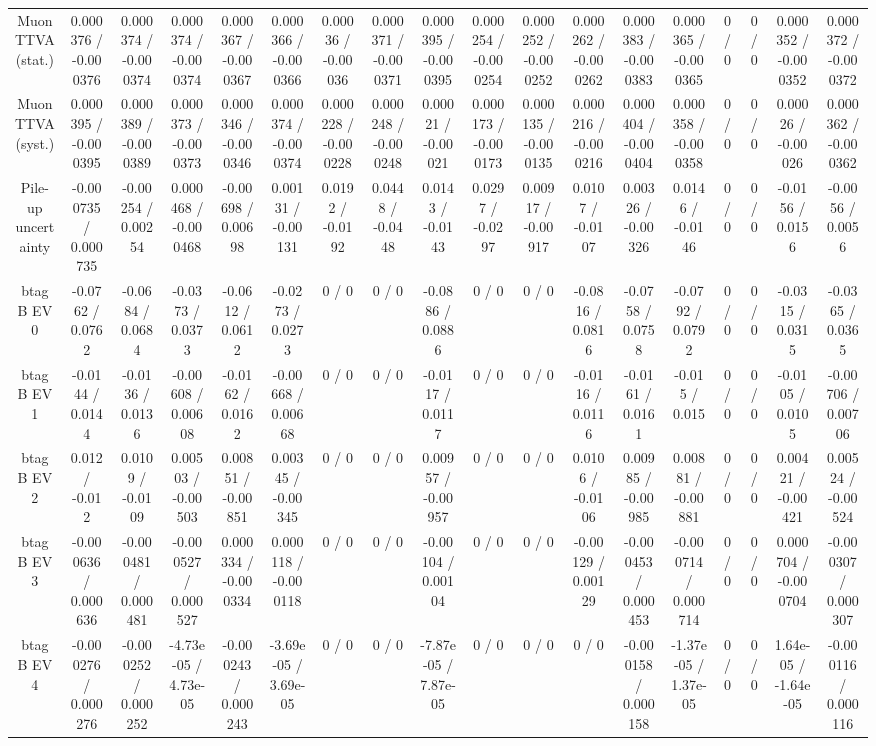 \documentclass[10pt]{article}
\begin{document}
\begin{table}[htbp]
\begin{center}
\begin{tabular}{|c|c|c|c|c|c|c|c|c|c|c|c|c|c|c|c|c|c|}
  Muon TTVA (stat.) & 0.000376 / -0.000376 & 0.000374 / -0.000374 & 0.000374 / -0.000374 & 0.000367 / -0.000367 & 0.000366 / -0.000366 & 0.00036 / -0.00036 & 0.000371 / -0.000371 & 0.000395 / -0.000395 & 0.000254 / -0.000254 & 0.000252 / -0.000252 & 0.000262 / -0.000262 & 0.000383 / -0.000383 & 0.000365 / -0.000365 & 0 / 0 & 0 / 0 & 0.000352 / -0.000352 & 0.000372 / -0.000372 \\ 
  Muon TTVA (syst.) & 0.000395 / -0.000395 & 0.000389 / -0.000389 & 0.000373 / -0.000373 & 0.000346 / -0.000346 & 0.000374 / -0.000374 & 0.000228 / -0.000228 & 0.000248 / -0.000248 & 0.00021 / -0.00021 & 0.000173 / -0.000173 & 0.000135 / -0.000135 & 0.000216 / -0.000216 & 0.000404 / -0.000404 & 0.000358 / -0.000358 & 0 / 0 & 0 / 0 & 0.00026 / -0.00026 & 0.000362 / -0.000362 \\ 
  Pile-up uncertainty & -0.000735 / 0.000735 & -0.00254 / 0.00254 & 0.000468 / -0.000468 & -0.00698 / 0.00698 & 0.00131 / -0.00131 & 0.0192 / -0.0192 & 0.0448 / -0.0448 & 0.0143 / -0.0143 & 0.0297 / -0.0297 & 0.00917 / -0.00917 & 0.0107 / -0.0107 & 0.00326 / -0.00326 & 0.0146 / -0.0146 & 0 / 0 & 0 / 0 & -0.0156 / 0.0156 & -0.0056 / 0.0056 \\ 
  btag B EV 0 & -0.0762 / 0.0762 & -0.0684 / 0.0684 & -0.0373 / 0.0373 & -0.0612 / 0.0612 & -0.0273 / 0.0273 & 0 / 0 & 0 / 0 & -0.0886 / 0.0886 & 0 / 0 & 0 / 0 & -0.0816 / 0.0816 & -0.0758 / 0.0758 & -0.0792 / 0.0792 & 0 / 0 & 0 / 0 & -0.0315 / 0.0315 & -0.0365 / 0.0365 \\ 
  btag B EV 1 & -0.0144 / 0.0144 & -0.0136 / 0.0136 & -0.00608 / 0.00608 & -0.0162 / 0.0162 & -0.00668 / 0.00668 & 0 / 0 & 0 / 0 & -0.0117 / 0.0117 & 0 / 0 & 0 / 0 & -0.0116 / 0.0116 & -0.0161 / 0.0161 & -0.015 / 0.015 & 0 / 0 & 0 / 0 & -0.0105 / 0.0105 & -0.00706 / 0.00706 \\ 
  btag B EV 2 & 0.012 / -0.012 & 0.0109 / -0.0109 & 0.00503 / -0.00503 & 0.00851 / -0.00851 & 0.00345 / -0.00345 & 0 / 0 & 0 / 0 & 0.00957 / -0.00957 & 0 / 0 & 0 / 0 & 0.0106 / -0.0106 & 0.00985 / -0.00985 & 0.00881 / -0.00881 & 0 / 0 & 0 / 0 & 0.00421 / -0.00421 & 0.00524 / -0.00524 \\ 
  btag B EV 3 & -0.000636 / 0.000636 & -0.000481 / 0.000481 & -0.000527 / 0.000527 & 0.000334 / -0.000334 & 0.000118 / -0.000118 & 0 / 0 & 0 / 0 & -0.00104 / 0.00104 & 0 / 0 & 0 / 0 & -0.00129 / 0.00129 & -0.000453 / 0.000453 & -0.000714 / 0.000714 & 0 / 0 & 0 / 0 & 0.000704 / -0.000704 & -0.000307 / 0.000307 \\ 
  btag B EV 4 & -0.000276 / 0.000276 & -0.000252 / 0.000252 & -4.73e-05 / 4.73e-05 & -0.000243 / 0.000243 & -3.69e-05 / 3.69e-05 & 0 / 0 & 0 / 0 & -7.87e-05 / 7.87e-05 & 0 / 0 & 0 / 0 & 0 / 0 & -0.000158 / 0.000158 & -1.37e-05 / 1.37e-05 & 0 / 0 & 0 / 0 & 1.64e-05 / -1.64e-05 & -0.000116 / 0.000116 \\ 

\end{tabular}
\end{center}
\end{table}
\end{document}
